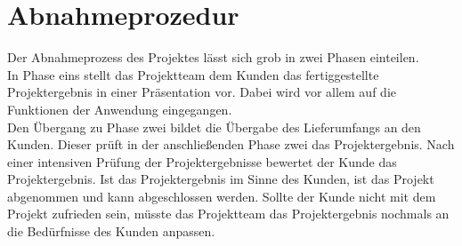 \chapter{Abnahmeprozedur}
Der Abnahmeprozess des Projektes lässt sich grob in zwei Phasen einteilen.\\
In Phase eins stellt das Projektteam dem Kunden das fertiggestellte Projektergebnis in einer Präsentation vor. Dabei wird vor allem auf die Funktionen der Anwendung eingegangen.\\
Den Übergang zu Phase zwei bildet die Übergabe des Lieferumfangs an den Kunden. Dieser prüft in der anschließenden Phase zwei das Projektergebnis. Nach einer intensiven Prüfung der Projektergebnisse bewertet der Kunde das Projektergebnis. Ist das Projektergebnis im Sinne des Kunden, ist das Projekt abgenommen und kann abgeschlossen werden. Sollte der Kunde nicht mit dem Projekt zufrieden sein, müsste das Projektteam das Projektergebnis nochmals an die Bedürfnisse des Kunden anpassen.  